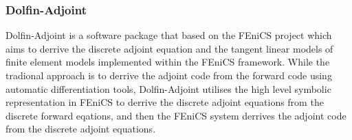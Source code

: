   

\subsubsection{Dolfin-Adjoint}

Dolfin-Adjoint is a software package that based on the FEniCS project
which aims to derrive the discrete adjoint equation and the tangent
linear models of finite element models implemented within the FEniCS
framework. While the tradional approach is to derrive the adjoint code
from the forward code using automatic differentiation tools,
Dolfin-Adjoint utilises the high level symbolic representation
\cite{UFL} in FEniCS to derrive the discrete adjoint equations from
the discrete forward eqations, and then the FEniCS system derrives the
adjoint code from the discrete adjoint equations. 





